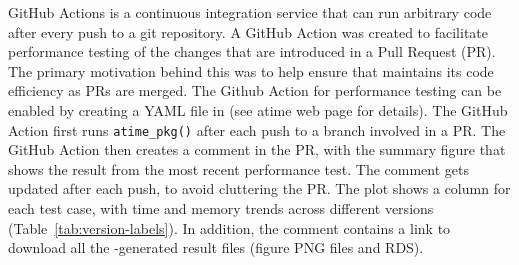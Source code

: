 GitHub Actions is a continuous integration service that can run arbitrary code after every push to a git repository.
A GitHub Action was created to facilitate performance testing of the changes that are introduced in a Pull Request (PR). 
The primary motivation behind this was to help ensure that  maintains its code efficiency as PRs are merged.
The Github Action for performance testing can be enabled by creating a YAML file in  (see atime web page for details).
The GitHub Action first runs \verb|atime_pkg()| after each push to a branch involved in a PR.
The GitHub Action then creates a comment in the PR, with the summary figure that shows the result from the most recent performance test.
The comment gets updated after each push, to avoid cluttering the PR.
The plot shows a column for each test case, with time and memory trends across different  versions (Table~\ref{tab:version-labels}).
In addition, the comment contains a link to download all the -generated result files (figure PNG files and RDS).

